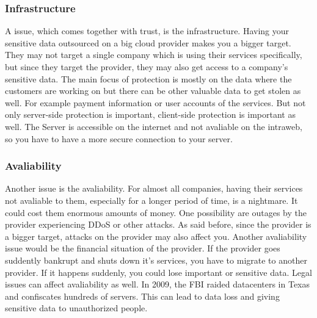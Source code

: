 \subsubsection{Infrastructure}
A issue, which comes together with trust, is the infrastructure. Having your sensitive data outsourced on a big cloud provider makes you a bigger target. They may not target a single company which is using their services specifically, but since they target the provider, they may also get access to a company's sensitive data. 
The main focus of protection is mostly on the data where the customers are working on but there can be other valuable data to get stolen as well. For example payment information or user accounts of the services. 
But not only server-side protection is important, client-side protection is important as well. The Server is accessible on the internet and not avaliable on the intraweb, so you have to have a more secure connection to your server.
\cite{hooks}

\subsubsection{Avaliability}
Another issue is the avaliability. For almost all companies, having their services not avaliable to them, especially for a longer period of time, is a nightmare. It could cost them enormous amounts of money. One possibility are outages by the provider experiencing DDoS or other attacks. As said before, since the provider is a bigger target, attacks on the provider may also affect you. Another avaliability issue would be the financial situation of the provider. If the provider goes  suddently bankrupt and shuts down it's services, you have to migrate to another provider. If it happens suddenly, you could lose important or sensitive data. 
Legal issues can affect avaliability as well. In 2009, the FBI raided datacenters in Texas and confiscates hundreds of servers. \cite{fbi_raid} This can lead to data loss and giving sensitive data to unauthorized people. 

